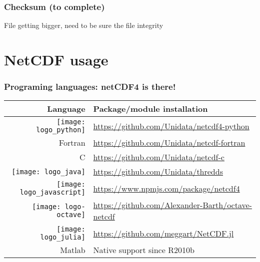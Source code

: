 
\begin{frame}
\frametitle{Checksum (to complete)}
File getting bigger, need to be sure the file integrity

\end{frame}

\section{NetCDF usage}

\begin{frame}
\frametitle{Programing languages: netCDF4 is there!}
\begin{table}
\begin{tabular}{rl}
\toprule
Language 	& 		Package/module installation \\
\midrule
\texttt{[image: logo\_python]}		& 		\url{https://github.com/Unidata/netcdf4-python}\\
Fortran											& 		\url{https://github.com/Unidata/netcdf-fortran}\\
C												& 		\url{https://github.com/Unidata/netcdf-c}\\
\texttt{[image: logo\_java]}			& 		\url{https://github.com/Unidata/thredds}\\
\texttt{[image: logo\_javascript]}	& 		\url{https://www.npmjs.com/package/netcdf4}\\
\texttt{[image: logo-octave]}		&		\url{https://github.com/Alexander-Barth/octave-netcdf}\\
\texttt{[image: logo\_julia]}		&  		\url{https://github.com/meggart/NetCDF.jl}\\
Matlab											&		Native support since R2010b\\
\bottomrule
\end{tabular}
\end{table}


\end{frame}


